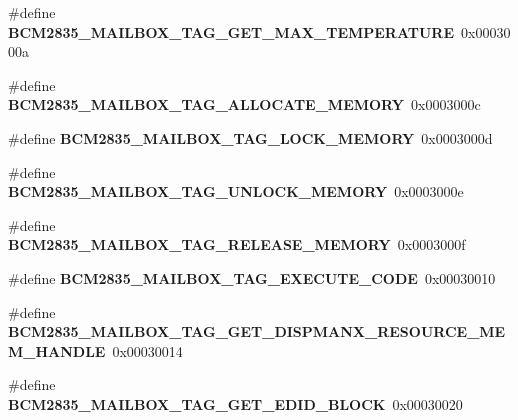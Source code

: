 \begin{DoxyCompactItemize}
\#define {\bfseries B\+C\+M2835\+\_\+\+M\+A\+I\+L\+B\+O\+X\+\_\+\+T\+A\+G\+\_\+\+G\+E\+T\+\_\+\+M\+A\+X\+\_\+\+T\+E\+M\+P\+E\+R\+A\+T\+U\+RE}~0x0003000a
\item 
\mbox{\label{group__raspberrypi__vc_ga5f89682ebe04351ec5a3014dd0e3b2d6}} 
\#define {\bfseries B\+C\+M2835\+\_\+\+M\+A\+I\+L\+B\+O\+X\+\_\+\+T\+A\+G\+\_\+\+A\+L\+L\+O\+C\+A\+T\+E\+\_\+\+M\+E\+M\+O\+RY}~0x0003000c
\item 
\mbox{\label{group__raspberrypi__vc_gab7a3bd2b220cd675b3ead9806521aeb8}} 
\#define {\bfseries B\+C\+M2835\+\_\+\+M\+A\+I\+L\+B\+O\+X\+\_\+\+T\+A\+G\+\_\+\+L\+O\+C\+K\+\_\+\+M\+E\+M\+O\+RY}~0x0003000d
\item 
\mbox{\label{group__raspberrypi__vc_gad73653b29bbbb7cfbd45cc230e031baa}} 
\#define {\bfseries B\+C\+M2835\+\_\+\+M\+A\+I\+L\+B\+O\+X\+\_\+\+T\+A\+G\+\_\+\+U\+N\+L\+O\+C\+K\+\_\+\+M\+E\+M\+O\+RY}~0x0003000e
\item 
\mbox{\label{group__raspberrypi__vc_ga5935bfa2e74b3bd0eb702780269960d0}} 
\#define {\bfseries B\+C\+M2835\+\_\+\+M\+A\+I\+L\+B\+O\+X\+\_\+\+T\+A\+G\+\_\+\+R\+E\+L\+E\+A\+S\+E\+\_\+\+M\+E\+M\+O\+RY}~0x0003000f
\item 
\mbox{\label{group__raspberrypi__vc_ga4bd85a46b0145ade73ff90ba432234ac}} 
\#define {\bfseries B\+C\+M2835\+\_\+\+M\+A\+I\+L\+B\+O\+X\+\_\+\+T\+A\+G\+\_\+\+E\+X\+E\+C\+U\+T\+E\+\_\+\+C\+O\+DE}~0x00030010
\item 
\mbox{\label{group__raspberrypi__vc_ga44be20cf6c4a34b2c4ceac815657545e}} 
\#define {\bfseries B\+C\+M2835\+\_\+\+M\+A\+I\+L\+B\+O\+X\+\_\+\+T\+A\+G\+\_\+\+G\+E\+T\+\_\+\+D\+I\+S\+P\+M\+A\+N\+X\+\_\+\+R\+E\+S\+O\+U\+R\+C\+E\+\_\+\+M\+E\+M\+\_\+\+H\+A\+N\+D\+LE}~0x00030014
\item 
\mbox{\label{group__raspberrypi__vc_ga44508c5cbe6c94009eee1680f06fc429}} 
\#define {\bfseries B\+C\+M2835\+\_\+\+M\+A\+I\+L\+B\+O\+X\+\_\+\+T\+A\+G\+\_\+\+G\+E\+T\+\_\+\+E\+D\+I\+D\+\_\+\+B\+L\+O\+CK}~0x00030020
\item 
\mbox{\label{group__raspberrypi__vc_gaf9dd5cff862f5231b41fbe1fac2352a8}} 

\end{DoxyCompactItemize}
